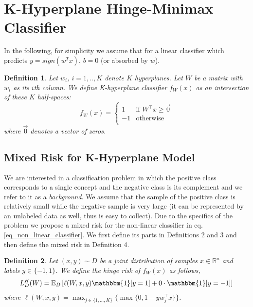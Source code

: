 \documentclass[twoside,11pt]{article}
\newtheorem{mydef}{Definition}
\begin{document}
\section{K-Hyperplane Hinge-Minimax Classifier}
In the following, for simplicity  we assume that for a linear classifier which predicts $y=sign(w^Tx)$, $b=0$ (or absorbed by $w$).

\begin{mydef} Let $w_i$, $i=1,..,K$ denote $K$ hyperplanes. Let $W$ be a matrix with $w_i$ as its $i$th column. We define K-hyperplane classifier $f_W(x)$ as an intersection of these $K$ half-spaces:
\begin{equation}\label{eq_non_linear_classifier}
 f_W(x)=\left\{
              \begin{array}{ll}
              1 & \mbox{if  } W^\top x \geq \vec{0} \\
              -1 & \mbox{otherwise} \\
              \end{array}
          \right.
 \end{equation}
 where $\vec{0}$ denotes a vector of zeros.
\end{mydef}
\subsection{Mixed Risk for K-Hyperplane Model}\label{KHHM}
We are interested in a classification problem in which the positive class corresponds to a single concept and the negative class is its complement and we refer to it as a \emph{background}. We assume that the sample of the positive class is relatively small while the negative sample is very large (it can be represented by an unlabeled data as well, thus is easy to collect). Due to the specifics of the problem we propose a mixed risk for the non-linear classifier in eq. \ref{eq_non_linear_classifier}. We first define its parts in Definitions 2 and 3 and then define the mixed risk in Definition 4.
\begin{mydef} Let $(x,y)\sim D$  be a joint distribution of samples $x \in \mathbb{R}^n$ and labels $ y \in \{-1,1\}$.
We define the \emph{hinge risk} of $f_W(x)$ as follows,
\begin{equation}
\label{def_hinge_risk}
L_D^{H}(W)=\mathbb{E}_D\left[\ell(W,x,y)\mathbbm{1}[y=1]+0\cdot \mathbbm{1}[y=-1]\right]
\end{equation}
where $\ell(W,x,y)=\max_{j\in\{1,...,K\}} \{\max\{0,1-yw_j^\top x\}\}$.
\end{mydef}
\end{document}
